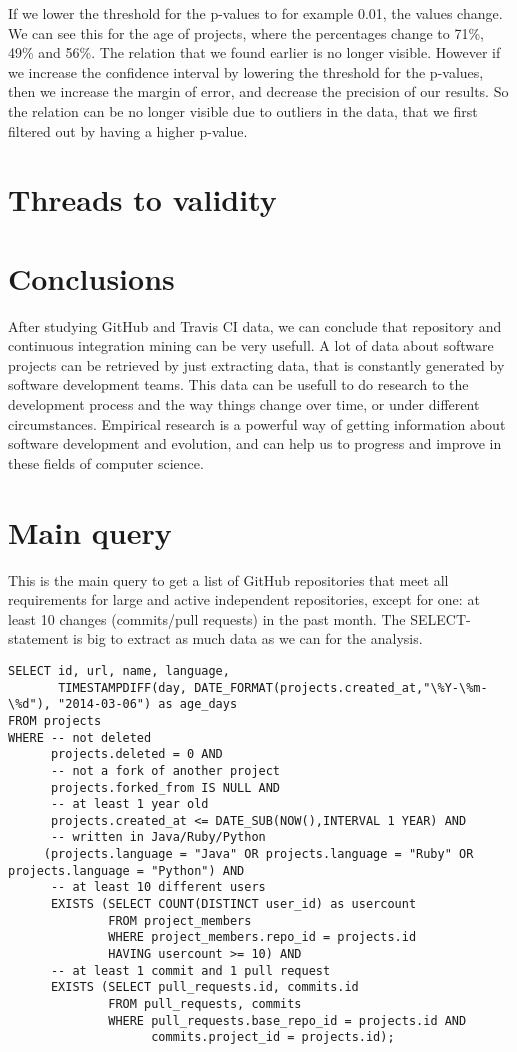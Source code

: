 \documentclass[a4paper,11pt]{article}
\begin{document}
			If we lower the threshold for the p-values to for example 0.01, the values change. We can see this for the age of projects, where the percentages change to 71\%, 49\% and 56\%. The relation that we found earlier is no longer visible. However if we increase the confidence interval by lowering the threshold for the p-values, then we increase the margin of error, and decrease the precision of our results. So the relation can be no longer visible due to outliers in the data, that we first filtered out by having a higher p-value. 
			
	\section{Threads to validity}
		
	
	\section{Conclusions}
		After studying GitHub and Travis CI data, we can conclude that repository and continuous integration mining can be very usefull. A lot of data about software projects can be retrieved by just extracting data, that is constantly generated by software development teams. This data can be usefull to do research to the development process and the way things change over time, or under different circumstances. Empirical research is a powerful way of getting information about software development and evolution, and can help us to progress and improve in these fields of computer science.

	\appendix
	\section{Main query}
	\label{app:mainquery}
	This is the main query to get a list of GitHub repositories that meet all requirements for large and active independent repositories, except for one: at least 10 changes (commits/pull requests) in the past month. The SELECT-statement is big to extract as much data as we can for the analysis.
	
	{\scriptsize
	\begin{verbatim}
SELECT id, url, name, language, 
       TIMESTAMPDIFF(day, DATE_FORMAT(projects.created_at,"\%Y-\%m-\%d"), "2014-03-06") as age_days 
FROM projects 
WHERE -- not deleted
      projects.deleted = 0 AND 
      -- not a fork of another project
      projects.forked_from IS NULL AND 
      -- at least 1 year old
      projects.created_at <= DATE_SUB(NOW(),INTERVAL 1 YEAR) AND 
      -- written in Java/Ruby/Python
     (projects.language = "Java" OR projects.language = "Ruby" OR projects.language = "Python") AND 
      -- at least 10 different users
      EXISTS (SELECT COUNT(DISTINCT user_id) as usercount 
              FROM project_members 
              WHERE project_members.repo_id = projects.id  
              HAVING usercount >= 10) AND 
      -- at least 1 commit and 1 pull request
      EXISTS (SELECT pull_requests.id, commits.id 
              FROM pull_requests, commits 
              WHERE pull_requests.base_repo_id = projects.id AND 
                    commits.project_id = projects.id);
	\end{verbatim}
	}
	
\end{document}
